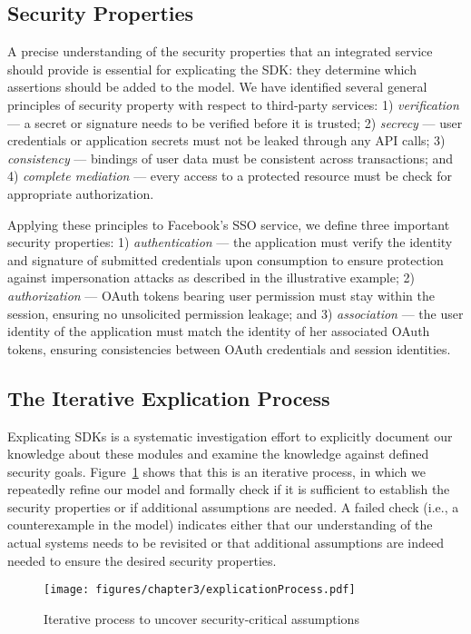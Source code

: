 \subsection{Security Properties}
\label{sec:securityProperties}
A precise understanding of the security properties that an integrated service should provide is essential for explicating the SDK: they determine which assertions should be added to the model.  We have identified several general principles of security property with respect to third-party services: 1) \emph{verification} --- a secret or signature needs to be verified before it is trusted; 2) \emph{secrecy} --- user credentials or application secrets must not be leaked through any API calls; 3) \emph{consistency} --- bindings of user data must be consistent across transactions; and 4) \emph{complete mediation} --- every access to a protected resource must be check for appropriate authorization.  

Applying these principles to Facebook's SSO service, we define three important security properties: 1) \emph{authentication}
--- the application must verify the identity and signature of submitted credentials upon consumption to ensure protection against impersonation attacks as described in the illustrative example; 2) \emph{authorization} --- OAuth tokens bearing user
permission must stay within the session, ensuring no unsolicited permission leakage; and 3) \emph{association} --- the user identity of the application must match the identity of her associated OAuth tokens, ensuring consistencies between OAuth credentials and session identities.

\subsection{The Iterative Explication Process}

Explicating SDKs is a systematic investigation effort to explicitly document our knowledge about these modules and examine the knowledge against defined security goals.  Figure~\ref{fig:iterativeprocess} shows that this is an iterative process, in which we repeatedly refine our model and formally check if it is sufficient to establish the security properties or if additional assumptions are needed.  A failed check (i.e., a counterexample in the model) indicates either that our understanding of the actual systems needs to be revisited or that additional assumptions are indeed needed to ensure the desired security properties.  

\begin{figure}[hbt]
\centering
\texttt{[image: figures/chapter3/explicationProcess.pdf]}
\caption{Iterative process to uncover security-critical assumptions}
\label{fig:iterativeprocess}
\end{figure}

